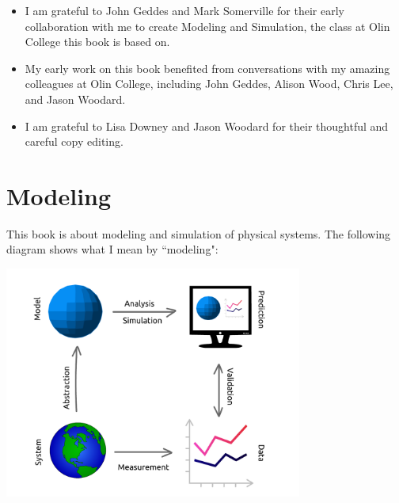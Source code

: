 \documentclass[12pt]{book}
\theoremstyle{exercise}
\begin{document}
\begin{itemize}

\item I am grateful to John Geddes and Mark Somerville for their early collaboration with me to create Modeling and Simulation, the class at Olin College this book is based on.

\item My early work on this book benefited from conversations with
my amazing colleagues at Olin College, including John Geddes, Alison
Wood, Chris Lee, and Jason Woodard.

\item I am grateful to Lisa Downey and Jason Woodard for their thoughtful and careful copy editing.



\end{itemize}



\normalsize

\cleardoublepage

\begin{latexonly}


\cleardoublepage

\end{latexonly}

\mainmatter


\chapter{Modeling}
\label{chap01}

This book is about modeling and simulation of physical systems.  
The following diagram shows what I mean by ``modeling":


\vspace{0.2in}
\centerline{\includegraphics[height=3in]{figs/modeling_framework.pdf}}
\end{document}
